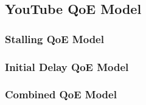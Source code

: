 \subsection{YouTube QoE Model}\label{sec:application:qoe_user_behaviour:typical_user_scenarios:youtube_qoe}
\subsubsection*{Stalling QoE Model}\label{sec:application:qoe_user_behaviour:typical_user_scenarios:youtube_qoe:stalling}
\subsubsection*{Initial Delay QoE Model}\label{sec:application:qoe_user_behaviour:typical_user_scenarios:initial_delay}
\subsubsection*{Combined QoE Model}\label{sec:application:qoe_user_behaviour:typical_user_scenarios:youtube_qoe:combined}
